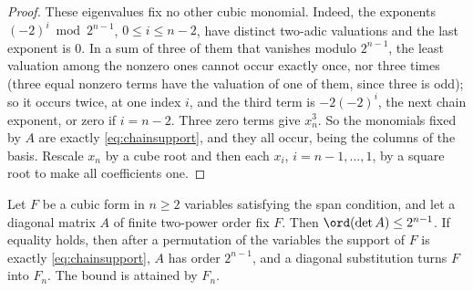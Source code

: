 \begin{proof}
These eigenvalues fix no other cubic monomial. Indeed, the exponents
$(-2)^i\bmod2^{n-1}$, $0\le i\le n-2$, have distinct two-adic valuations and
the last exponent is $0$. In a sum of three of them that vanishes modulo
$2^{n-1}$, the least valuation among the nonzero ones cannot occur exactly
once, nor three times (three equal nonzero terms have the valuation of one of
them, since three is odd); so it occurs twice, at one index $i$, and the third
term is $-2(-2)^i$, the next chain exponent, or zero if $i=n-2$. Three zero
terms give $x_n^3$. So the monomials fixed by $A$ are exactly
\eqref{eq:chainsupport}, and they all occur, being the columns of the basis.
Rescale $x_n$ by a cube root and then each $x_i$, $i=n-1,\dots,1$, by a square
root to make all coefficients one.
\end{proof}

\begin{theorem}\label{thm:fullcubicsupport}
Let $F$ be a cubic form in $n\ge2$ variables satisfying the span condition, and
let a diagonal matrix $A$ of finite two-power order fix $F$. Then
$\ord(\det A)\le2^{n-1}$. If equality holds, then after a permutation of the
variables the support of $F$ is exactly \eqref{eq:chainsupport}, $A$ has order
$2^{n-1}$, and a diagonal substitution turns $F$ into $F_n$. The bound is
attained by $F_n$.
\end{theorem}

